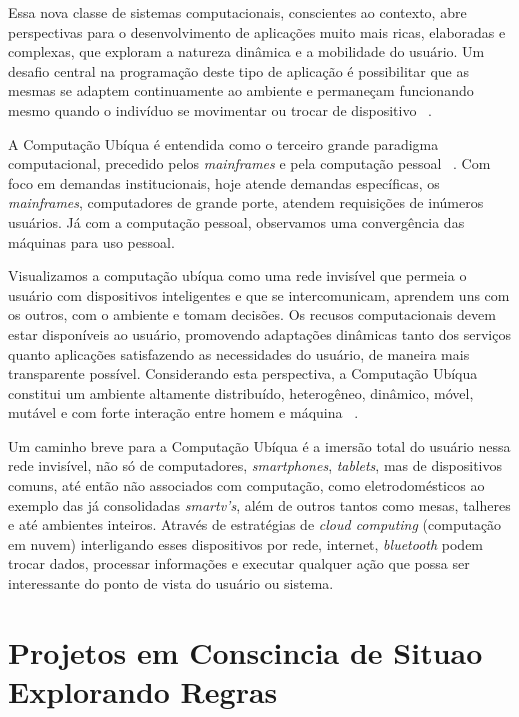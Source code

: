 \documentclass[12pt,a4paper,compsoc]{IEEEtran}
\begin{document}
  Essa nova classe de sistemas computacionais, conscientes ao contexto, abre perspectivas para o
  desenvolvimento de aplicações muito mais ricas, elaboradas e complexas, que exploram a natureza
  dinâmica e a mobilidade do usuário. Um desafio central na programação deste tipo de aplicação é
  possibilitar que as mesmas se adaptem continuamente ao ambiente e permaneçam funcionando mesmo
  quando o indivíduo se movimentar ou trocar de dispositivo ~\cite{GrimmB03, Cac08}.
  
  A Computação Ubíqua é entendida como o terceiro grande paradigma computacional, precedido pelos
  \textit{mainframes} e pela computação pessoal ~\cite{weiser1997}. Com foco em demandas 
  institucionais, hoje atende demandas específicas, os \textit{mainframes}, computadores de grande
  porte, atendem requisições de inúmeros usuários. Já com a computação pessoal, observamos uma
  convergência das máquinas para uso pessoal.
  
  Visualizamos a computação ubíqua como uma rede invisível que permeia o usuário com dispositivos
  inteligentes e que se intercomunicam, aprendem uns com os outros, com o ambiente e tomam
  decisões. Os recusos computacionais devem estar disponíveis ao usuário, promovendo adaptações
  dinâmicas tanto dos serviços quanto aplicações satisfazendo as necessidades do usuário, de 
  maneira mais transparente possível. Considerando esta perspectiva, a Computação Ubíqua constitui
  um ambiente altamente distribuído, heterogêneo, dinâmico, móvel, mutável e com forte interação
  entre homem e máquina ~\cite{Augustin03}.
  
  Um caminho breve para a Computação Ubíqua é a imersão total do usuário nessa rede invisível, não
  só de computadores, \textit{smartphones}, \textit{tablets}, mas de dispositivos comuns, até então
  não associados com computação, como eletrodomésticos ao exemplo das já consolidadas 
  \textit{smartv's}, além de outros tantos como mesas, talheres e até ambientes inteiros. Através
  de estratégias de \textit{cloud computing} (computação em nuvem) interligando esses dispositivos
  por rede, internet, \textit{bluetooth} podem trocar dados, processar informações e executar
  qualquer ação que possa ser interessante do ponto de vista do usuário ou sistema.
  


\section{Projetos em Conscincia de Situao Explorando Regras}
\end{document}

